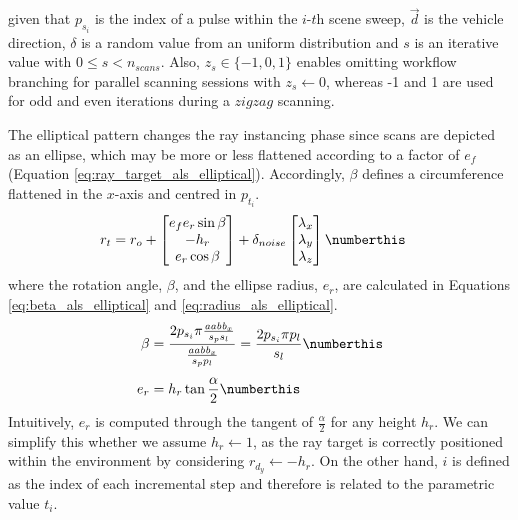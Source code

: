 given that $p_{s_{i}}$ is the index of a pulse within the $\textit{i-th}$ scene sweep, $\vec{d}$ is the vehicle direction, $\delta$ is a random value from an uniform distribution and $s$ is an iterative value with $0 \leq s < n_{\textit{scans}}$. Also, $\textit{z}_{s} \in \{-1, 0, 1\}$ enables omitting workflow branching for parallel scanning sessions with $\textit{z}_{s} \gets 0$, whereas -1 and 1 are used for odd and even iterations during a $\textit{zigzag}$ scanning. 

The elliptical pattern changes the ray instancing phase since scans are depicted as an ellipse, which may be more or less flattened according to a factor of $e_{f}$ (Equation \ref{eq:ray_target_als_elliptical}). Accordingly, $\beta$ defines a circumference flattened in the $x$-axis and centred in $p_{t_{i}}$. 
\begin{align*}
    r_{t} &= r_{o} + 
    \begin{bmatrix}e_{f} e_{r} \sin{\beta}\\ -h_{r}\\ e_{r} \cos{\beta}\end{bmatrix} + \delta_{noise}
    \begin{bmatrix}\lambda_{x} \\ \lambda_{y}\\ \lambda_{z} \end{bmatrix}
    \numberthis \label{eq:ray_target_als_elliptical}
\end{align*}
where the rotation angle, $\beta$, and the ellipse radius, $e_{r}$, are calculated in Equations \ref{eq:beta_als_elliptical} and \ref{eq:radius_als_elliptical}.
\begin{align*}
    \beta &= \frac{2 p_{s_{i}} \pi \frac{\textit{aabb}_{x}}{s_{p} s_{l}}}{\frac{\textit{aabb}_{x}}{s_{p} p_{l}}} = \frac{2 p_{s_{i}} \pi p_{l}}{s_{l}} 
    \numberthis \label{eq:beta_als_elliptical}\\[0.4em]
    e_{r} &= h_{r} \tan{\frac{\alpha}{2}}  
    \numberthis \label{eq:radius_als_elliptical}
\end{align*}
Intuitively, $e_{r}$ is computed through the tangent of $\frac{\alpha}{2}$ for any height $h_{r}$. We can simplify this whether we assume $h_{r} \gets 1$, as the ray target is correctly positioned within the environment by considering $r_{d_{y}} \gets -h_{r}$. On the other hand, $i$ is defined as the index of each incremental step and therefore is related to the parametric value $t_{i}$.

